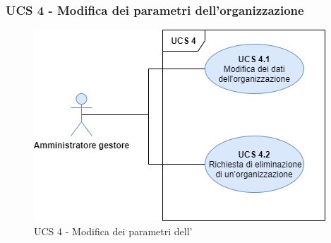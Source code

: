 \newpage
\subsubsection{UCS 4 - Modifica dei parametri dell'organizzazione}%

\begin{figure}[h]
	\centering	
	\includegraphics[scale=0.53]{Sezioni/UseCase/Immagini/UCS4.png}
	\caption{UCS 4 - Modifica dei parametri dell'}
\end{figure}

